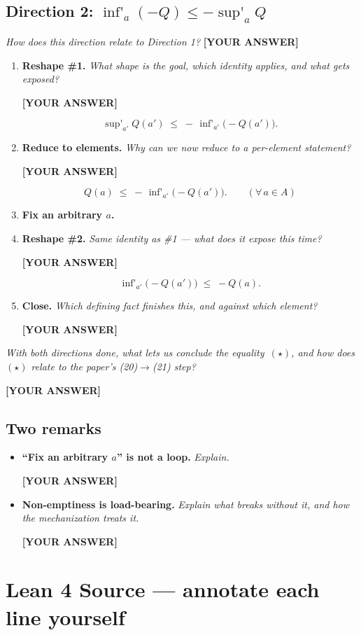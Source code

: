 \documentclass[11pt]{article}
\DeclareMathOperator*{\supp}{sup'}
\DeclareMathOperator*{\infp}{inf'}
\newcommand{\blank}{\par\vspace{2pt}\noindent\textbf{[YOUR ANSWER]}\par\vspace{6pt}}
\newcommand{\blankone}{\textbf{[YOUR ANSWER]}}
\begin{document}
\subsection*{Direction 2: \texorpdfstring{$\infp_a(-Q) \le -\supp_a Q$}{inf(-Q) <= -sup Q}}

\emph{How does this direction relate to Direction 1?}
\blankone

\begin{enumerate}
  \item \textbf{Reshape \#1.} \emph{What shape is the goal, which identity
    applies, and what gets exposed?}
    \blank
    \[
      \supp_{a'} Q(a') \;\le\; -\,\infp_{a'}\bigl(-Q(a')\bigr).
    \]
  \item \textbf{Reduce to elements.} \emph{Why can we now reduce to a per-element
    statement?}
    \blank
    \[
      Q(a) \;\le\; -\,\infp_{a'}\bigl(-Q(a')\bigr). \qquad (\forall\, a \in A)
    \]
  \item \textbf{Fix an arbitrary $a$.}
  \item \textbf{Reshape \#2.} \emph{Same identity as \#1 --- what does it expose
    this time?}
    \blank
    \[
      \infp_{a'}\bigl(-Q(a')\bigr) \;\le\; -Q(a).
    \]
  \item \textbf{Close.} \emph{Which defining fact finishes this, and against
    which element?}
    \blank
\end{enumerate}

\emph{With both directions done, what lets us conclude the equality~$(\star)$,
and how does $(\star)$ relate to the paper's (20)$\to$(21) step?}
\blank

\subsection*{Two remarks}

\begin{itemize}
  \item \textbf{``Fix an arbitrary $a$'' is not a loop.} \emph{Explain.}
    \blank
  \item \textbf{Non-emptiness is load-bearing.} \emph{Explain what breaks
    without it, and how the mechanization treats it.}
    \blank
\end{itemize}

\appendix
\section{Lean 4 Source --- annotate each line yourself}
\end{document}
